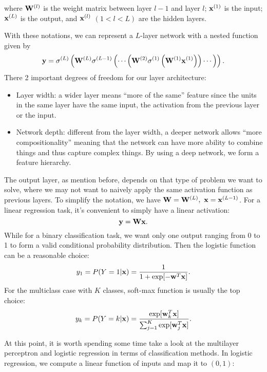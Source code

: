 \documentclass[../main.tex]{subfiles}
\begin{document}
where ${\bf W}^{(l)}$ is the weight matrix between layer $l-1$ and layer $l$; ${\bf x}^{(1)}$ is the input; ${\bf x}^{(L)}$ is the output, and ${\bf x}^{(l)}$ $(1<l<L)$ are the hidden layers. \par With these notations, we can represent a $L$-layer network with a nested function given by
\begin{equation*}
{\bf y} = \sigma^{(L)}\left({\bf W}^{(L)}\sigma^{(L-1)}\left(\cdots\left({\bf W}^{(2)}\sigma^{(1)}\left({\bf W}^{(1)}{\bf x}^{(1)}\right)\right)\cdots\right)\right).
\end{equation*}
There 2 important degrees of freedom for our layer architecture:
\begin{itemize}
	\item Layer width: a wider layer means ``more of the same'' feature since the units in the same layer have the same input, the activation from the previous layer or the input.
	\item Network depth: different from the layer width, a deeper network allows ``more compositionality'' meaning that the network can have more ability to combine things and thus capture complex things. By using a deep network, we form a feature hierarchy.
\end{itemize}
\par The output layer, as mention before, depends on that type of problem we want to solve, where we may not want to naively apply the same activation function as previous layers. To simplify the notation, we have ${\bf W} = {\bf W}^{(L)},\ {\bf x}={\bf x}^{(L-1)}$. For a linear regression task, it's convenient to simply have a linear activation:
\begin{equation*}
{\bf y}={\bf Wx}.
\end{equation*}
While for a binary classification task, we want only one output ranging from 0 to 1 to form a valid conditional probability distribution. Then the logistic function can be a reasonable choice:
\begin{equation*}
y_1 = P(Y=1|{\bf x})=\frac{1}{1+\exp[-{\bf w}^T {\bf x}]}.
\end{equation*}
For the multiclass case with $K$ classes, soft-max function is usually the top choice:
\begin{equation*}
y_k = P(Y=k|{\bf x})=\frac{\exp[{\bf w}_k^T {\bf x}]}{\sum_{j=1}^{K}\exp[{\bf w}_j^T {\bf x}]}.
\end{equation*}
\par At this point, it is worth spending some time take a look at the multilayer perceptron and logistic regression in terms of classification methods. In logistic regression, we compute a linear function of inputs and map it to $(0,1)$:
\end{document}
